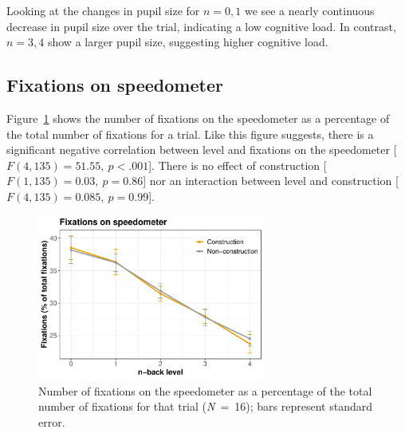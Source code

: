 Looking at the changes in pupil size for \(n = 0,1\) we see a nearly continuous decrease in pupil size over the trial, indicating a low cognitive load.
In contrast, \(n=3,4\) show a larger pupil size, suggesting higher cognitive load.

\subsection{Fixations on speedometer}
Figure~\ref{fig:fix-speedometer} shows the number of fixations on the speedometer as a percentage of the total number of fixations for a trial.
Like this figure suggests, there is a significant negative correlation between \nback level and fixations on the speedometer [\(F(4,135)=51.55,\ p<.001\)].
There is no effect of construction [\(F(1,135)=0.03,\ p=0.86\)] nor an interaction between \nback level and construction [\(F(4,135)=0.085,\ p=0.99\)]. 

\begin{figure}
  \centering
  \includegraphics[width=7.5cm]{images/speedometer_interaction.pdf}
  \caption{Number of fixations on the speedometer as a percentage of the total number of fixations for that trial (\textit{N}\ =\ 16); bars represent standard error.}
  \label{fig:fix-speedometer}
\end{figure}